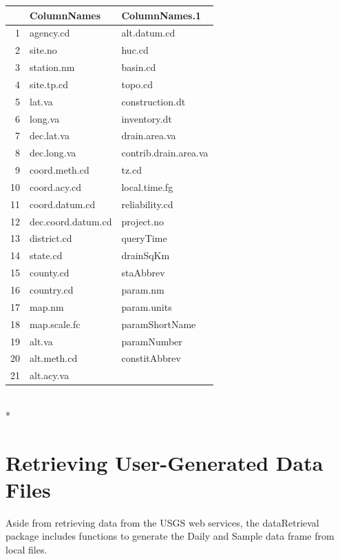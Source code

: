 \documentclass[a4paper,11pt]{article}
\begin{document}
\begin{tabular}{rll}
  \hline
 & ColumnNames & ColumnNames.1 \\ 
  \hline
1 & agency.cd & alt.datum.cd \\ 
  2 & site.no & huc.cd \\ 
  3 & station.nm & basin.cd \\ 
  4 & site.tp.cd & topo.cd \\ 
  5 & lat.va & construction.dt \\ 
  6 & long.va & inventory.dt \\ 
  7 & dec.lat.va & drain.area.va \\ 
  8 & dec.long.va & contrib.drain.area.va \\ 
  9 & coord.meth.cd & tz.cd \\ 
  10 & coord.acy.cd & local.time.fg \\ 
  11 & coord.datum.cd & reliability.cd \\ 
  12 & dec.coord.datum.cd & project.no \\ 
  13 & district.cd & queryTime \\ 
  14 & state.cd & drainSqKm \\ 
  15 & county.cd & staAbbrev \\ 
  16 & country.cd & param.nm \\ 
  17 & map.nm & param.units \\ 
  18 & map.scale.fc & paramShortName \\ 
  19 & alt.va & paramNumber \\ 
  20 & alt.meth.cd & constitAbbrev \\ 
  21 & alt.acy.va &  \\ 
   \hline
\end{tabular}
\\*


\newpage
\section{Retrieving User-Generated Data Files}
Aside from retrieving data from the USGS web services, the dataRetrieval package includes functions to generate the Daily and Sample data frame from local files.

\end{document}
